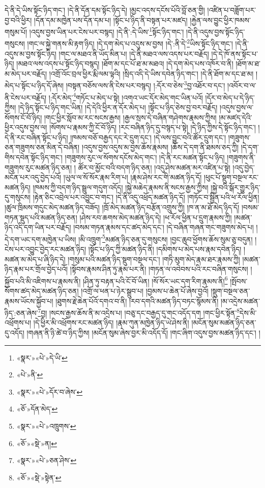 དེ་ནི་དེ་ཡིས་སྟོང་ཉིད་གང་། །དེ་ནི་དོན་དམ་སྟོང་ཉིད་དེ། །མྱང་འདས་དངོས་པོའི་བློ་ཅན་གྱི། །འཛིན་པ་བཟློག་པར་བྱ་བའི་ཕྱིར། །དོན་དམ་མཁྱེན་པས་དོན་དམ་པ། །སྟོང་པ་ཉིད་ནི་བསྟན་པར་མཛད། །རྐྱེན་ལས་བྱུང་ཕྱིར་ཁམས་གསུམ་པོ། །འདུས་བྱས་ཡིན་པར་ངེས་པར་བསྙད། །དེ་ནི་:དེ་ཡིས་\footnote{«སྣར་»«པེ་»དེ་ཡི་}སྟོང་ཉིད་གང་། །དེ་ནི་འདུས་བྱས་སྟོང་ཉིད་གསུངས། །གང་ལ་སྐྱེ་གནས་མི་རྟག་ཉིད། །དེ་དག་མེད་པ་འདུས་མ་བྱས། །དེ་:ནི་དེ་\footnote{«པེ་»ནི་}ཡིས་སྟོང་ཉིད་གང་། །དེ་ནི་འདུས་མ་བྱས་སྟོང་ཉིད། །གང་ལ་མཐའ་ནི་ཡོད་མིན་པ། །དེ་ནི་མཐའ་ལས་འདས་པར་བརྗོད། །དེ་དེ་ཁོ་ནས་སྟོང་པ་ཉིད། །མཐའ་ལས་འདས་པ་སྟོང་ཉིད་བསྙད། །ཐོག་མ་དང་པོ་ཐ་མ་མཐའ། །དེ་དག་མེད་པས་འཁོར་བ་ནི། །ཐོག་མ་ཐ་མ་མེད་པར་བརྗོད། །འགྲོ་འོང་བྲལ་ཕྱིར་རྨི་ལམ་ལྟའི། །སྲིད་འདི་དེ་ཡིས་དབེན་ཉིད་གང་། །དེ་ནི་ཐོག་མ་དང་ཐ་མ། །མེད་པ་སྟོང་པ་ཉིད་དོ་ཞེས། །བསྟན་བཅོས་ལས་ནི་ངེས་པར་བསྙད། །:དོར་བ་ཅེས་\footnote{«སྣར་»«པེ་»དོར་བ་ཞེས་}བྱ་འཐོར་བ་དང་། །འབོར་བ་ལ་ནི་ངེས་པར་བརྗོད། །:དོར་མེད་\footnote{«ཅོ་»དོན་མེད་}གཏོང་པ་མེད་པ་སྟེ། །འགའ་ཡང་དོར་མེད་གང་ཡིན་པའོ། །དོར་བ་མེད་པ་དེ་ཉིད་ཀྱིས། །དེ་ཉིད་སྟོང་པ་ཉིད་གང་ཡིན། །དེ་དེའི་ཕྱིར་ན་དོར་མེད་པ། །སྟོང་པ་ཉིད་ཅེས་བྱ་བར་བརྗོད། །འདུས་བྱས་ལ་སོགས་ངོ་བོ་ཉིད། །གང་ཕྱིར་སློབ་མ་རང་སངས་རྒྱས། །རྒྱལ་སྲས་དེ་བཞིན་གཤེགས་རྣམས་ཀྱིས། །མ་མཛད་དེའི་ཕྱིར་འདུས་བྱས་ལ། །སོགས་པ་རྣམས་ཀྱི་ངོ་བོ་ཉིད། །རང་བཞིན་ཉིད་དུ་བསྙད་པ་སྟེ། །དེ་ཉིད་ཀྱིས་དེ་སྟོང་ཉིད་གང་། །དེ་ནི་རང་བཞིན་སྟོང་པ་ཉིད། །ཁམས་བཅོ་བརྒྱད་དང་རེ་དྲུག་དང་། །དེ་ལས་བྱུང་བའི་ཚོར་དྲུག་དང་། །གཟུགས་ཅན་གཟུགས་ཅན་མིན་དེ་བཞིན། །འདུས་བྱས་འདུས་མ་བྱས་ཆོས་རྣམས། །ཆོས་དེ་དག་ནི་ཐམས་ཅད་ཀྱི། །དེ་དག་གིས་དབེན་སྟོང་ཉིད་གང་། །གཟུགས་རུང་ལ་སོགས་དངོས་མེད་གང་། །དེ་ནི་རང་མཚན་སྟོང་པ་ཉིད། །གཟུགས་ནི་གཟུགས་རུང་མཚན་ཉིད་ཅན། །
ཚོར་བ་མྱོང་བའི་བདག་ཉིད་ཅན། །འདུ་ཤེས་མཚན་མར་འཛིན་པ་སྟེ། །འདུ་བྱེད་མངོན་པར་འདུ་བྱེད་པའོ། །ཡུལ་ལ་སོ་སོར་རྣམ་རིག་པ། །རྣམ་ཤེས་རང་གི་མཚན་ཉིད་དོ། །ཕུང་པོ་སྡུག་བསྔལ་རང་མཚན་ཉིད། །ཁམས་ཀྱི་བདག་ཉིད་སྦྲུལ་གདུག་འདོད། །སྐྱེ་མཆེད་རྣམས་ནི་སངས་རྒྱས་ཀྱིས། །སྐྱེ་བའི་སྒོར་གྱུར་ཉིད་དུ་གསུངས། །རྟེན་ཅིང་འབྲེལ་པར་འབྱུང་བ་གང་། །དེ་ནི་འདུ་འཕྲོད་མཚན་ཉིད་དོ། །གཏོང་བ་སྦྱིན་པའི་ཕ་རོལ་ཕྱིན། །ཚུལ་ཁྲིམས་གདུང་མེད་མཚན་ཉིད་བཟོད། །ཁྲོ་མེད་མཚན་ཉིད་བརྩོན་འགྲུས་ཀྱི། །ཁ་ན་མ་ཐོ་མེད་ཉིད་དོ། །བསམ་གཏན་སྡུད་པའི་མཚན་ཉིད་ཅན། །ཤེས་རབ་ཆགས་མེད་མཚན་ཉིད་དེ། །ཕ་རོལ་ཕྱིན་པ་དྲུག་རྣམས་ཀྱི། །མཚན་ཉིད་འདི་དག་ཡིན་པར་བརྗོད། །བསམ་གཏན་རྣམས་དང་ཚད་མེད་དང་། །དེ་བཞིན་གཞན་གང་གཟུགས་མེད་པ། །དེ་དག་ཡང་དག་མཁྱེན་པ་ཡིས། །མི་འཁྲུག་\footnote{«སྣར་»«པེ་»འཁྲུགས་}མཚན་ཉིད་ཅན་དུ་གསུངས། །བྱང་ཆུབ་ཕྱོགས་ཆོས་སུམ་ཅུ་བདུན། །ངེས་པར་འབྱུང་བྱེད་རང་མཚན་ཉིད། །སྟོང་པ་ཉིད་ཀྱི་མཚན་ཉིད་ནི། །དམིགས་པ་མེད་པས་རྣམ་དབེན་ཉིད། །མཚན་མ་མེད་པ་ཞི་ཉིད་དེ། །གསུམ་པའི་མཚན་ཉིད་སྡུག་བསྔལ་དང་། །གཏི་མུག་མེད་རྣམ་ཐར་རྣམས་ཀྱི། །མཚན་ཉིད་རྣམ་པར་གྲོལ་བྱེད་པའོ། །སྟོབས་རྣམས་ཤིན་ཏུ་རྣམ་པར་ནི། །གཏན་ལ་འབེབས་པའི་རང་བཞིན་གསུངས། །སྐྱོབ་པའི་མི་འཇིགས་པ་རྣམས་ནི། །ཤིན་ཏུ་བརྟན་པའི་ངོ་བོ་ཡིན། །སོ་སོར་ཡང་དག་རིག་རྣམས་ནི།\footnote{«ཅོ་»«སྡེ་»ན།} །སྤོབས་སོགས་ཚད་མེད་མཚན་ཉིད་ཅན། །འགྲོ་ལ་ཕན་པ་ཉེར་སྒྲུབ་པ། །བྱམས་པ་ཆེན་པོ་ཞེས་བྱའོ། །སྡུག་བསྔལ་ཅན་རྣམས་ཡོངས་སྐྱོབ་པ། །ཐུགས་རྗེ་ཆེན་པོའོ་དགའ་བ་ནི། །རབ་དགའི་མཚན་ཉིད་བཏང་སྙོམས་ནི། །མ་འདྲེས་མཚན་ཉིད་:ཅན་ཞེས་\footnote{«སྣར་»«པེ་»ཅན་ཤེས་}བྱ། །སངས་རྒྱས་ཆོས་ནི་མ་འདྲེས་པ། །བཅུ་དང་བརྒྱད་དུ་གང་འདོད་དག །གང་ཕྱིར་སྟོན་\footnote{«ཅོ་»«སྡེ་»སྟེན་}དེས་མི་འཕྲོགས་པ། །དེ་ཕྱིར་མི་འཕྲོགས་རང་མཚན་ཉིད། །རྣམ་ཀུན་མཁྱེན་ཉིད་ཡེ་ཤེས་ནི། །མངོན་སུམ་མཚན་ཉིད་ཅན་དུ་འདོད། །གཞན་ནི་ཉི་ཚེ་བ་ཉིད་ཀྱིས། །མངོན་སུམ་ཞེས་བྱར་མི་འདོད་དོ། །གང་ཞིག་འདུས་བྱས་མཚན་ཉིད་དང་། །
